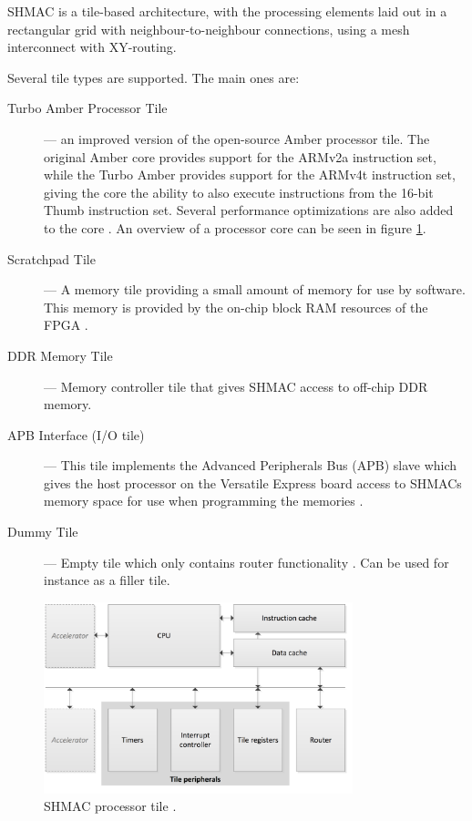SHMAC is a tile-based architecture, with the processing elements laid out in a rectangular
grid with neighbour-to-neighbour connections, using a mesh interconnect with XY-routing.

Several tile types are supported. The main ones are:

\begin{description}
  \item[Turbo Amber Processor Tile] --- an improved version of the open-source Amber processor tile.
  	The original Amber core provides support for the ARMv2a instruction set, while the Turbo Amber
	provides support for the ARMv4t instruction set, giving the core the ability to also execute
	instructions from the 16-bit Thumb instruction set. Several performance optimizations are
	also added to the core \cite{turboamber}. An overview of a processor core can be seen in
	figure \ref{fig:shmac-cpu}.
  \item[Scratchpad Tile] --- A memory tile providing a small amount of memory for use by software.
  	This memory is provided by the on-chip block RAM resources of the FPGA \cite{shmac-plan}.
  \item[DDR Memory Tile] --- Memory controller tile that gives SHMAC access to off-chip DDR memory.
  \item[APB Interface (I/O tile)] --- This tile implements the Advanced Peripherals Bus (APB) slave
  	which gives the host processor on the Versatile Express board access to SHMACs memory space
	for use when programming the memories \cite{shmac-plan}.
  \item[Dummy Tile] --- Empty tile which only contains router functionality \cite{shmac-plan}. Can be used for instance
  	as a filler tile.
\end{description}

\begin{figure}[htb]
    \centering
    \includegraphics[width=0.8\textwidth]{Figures/Heterogeneous/SHMACCPU}
    \caption{SHMAC processor tile \cite{shmac-plan}.}
    \label{fig:shmac-cpu}
\end{figure}


